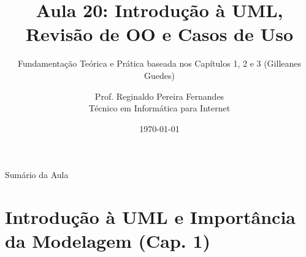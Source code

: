 \documentclass[10pt]{beamer}
\title[IFCE Tauá - Engenharia de Software]{Aula 20: Introdução à UML, Revisão de OO e Casos de Uso}
\subtitle{Fundamentação Teórica e Prática baseada nos Capítulos 1, 2 e 3 (Gilleanes Guedes)}
\author[Prof. Reginaldo Fernandes]{Prof. Reginaldo Pereira Fernandes\texorpdfstring{\\ \small{Técnico em Informática para Internet}}{}}
\institute[IFCE]{Instituto Federal do Ceará -- Campus Tauá}
\date{\today}
\begin{document}
\begin{frame}
    \titlepage
\end{frame}

\begin{frame}{Sumário da Aula}
    \tableofcontents
\end{frame}

\section{Introdução à UML e Importância da Modelagem (Cap. 1)}
\end{document}
